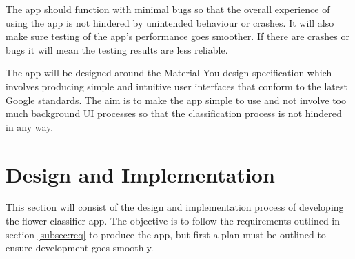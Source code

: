 \documentclass[12pt,a4paper]{report}
\begin{document}
\par

The app should function with minimal bugs so that the overall experience of using the app is not hindered by unintended 
behaviour or crashes. It will also make sure testing of the app's performance goes smoother. If there are crashes or 
bugs it will mean the testing results are less reliable.

\par

The app will be designed around the Material You design specification which involves producing simple and intuitive user
interfaces that conform to the latest Google standards. The aim is to make the app simple to use and not involve too 
much background UI processes so that the classification process is not hindered in any way. 

\par

\section{Design and Implementation}

This section will consist of the design and implementation process of developing the flower classifier app. 
The objective is to follow the requirements outlined in section \ref{subsec:req} to produce the app, but first a plan 
must be outlined to ensure development goes smoothly.

\par
\end{document}
